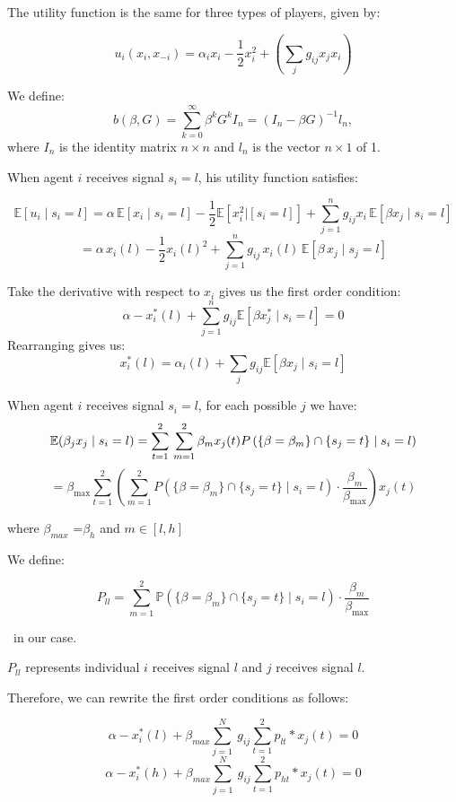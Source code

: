 \documentclass[12pt]{article}
\begin{document}
The utility function is the same for three types of players, given by:

\[
u_i(x_i, x_{-i}) = \alpha_i x_i - \frac{1}{2}x_i^2 + \left( \sum_j g_{ij} x_j x_i \right)
\]

We define:
\[
b(\beta, G) = \sum_{k=0}^{\infty} \beta^k G^k I_n = (I_n - \beta G)^{-1} l_n,
\]
where \( I_n \) is the identity matrix \( n \times n \) and \( l_n \) is the vector \( n \times 1 \) of 1.

When agent $i$ receives signal $s_i = l$, his utility function satisfies:


\[
\mathbb{E}[u_i \mid s_i = l] = \alpha \, \mathbb{E}[x_i \mid s_i = l]
-\frac{1}{2}\mathbb{E}[x_i^2|[s_i=l]]+ \sum_{j = 1}^n g_{ij} x_i\, \mathbb{E}[\beta x_j \mid s_i = l]
\]
\[
= \alpha \, x_i(l) - \frac{1}{2} x_i(l)^2 + \sum_{j=1}^{n} g_{ij} \, x_i(l) \, \mathbb{E}\left[ \beta \, x_j \mid s_j = l \right]
\]


Take the derivative with respect to $x_i$ gives us the first order condition:
\[
\alpha -x_i^*(l) +\sum_{j=1}^{n} g_{ij} \mathbb{E}[\beta x_j^* \mid s_i = l]=0
\]
Rearranging gives us:
\[
x^*_i(l) = \alpha_i(l) + \sum_j g_{ij} \mathbb{E}[\beta x_j \mid s_i = l]
\]



When agent $i$ receives signal $s_i =l$, for each possible $j$ we have:
\[
\mathbb{E}(\beta_j x_j \mid s_i = l) = \sum_{t=1}^{2} \\
\sum_{m=1}^{2} \beta_m x_j(t) P\left( \{\beta = \beta_m\} \cap \{s_j = t\} \mid s_i = l \right)
\]
\[
= \beta_{\max} \sum_{t=1}^{2} \left(\sum_{m=1}^2 P\left( \{\beta = \beta_m\} \cap \{s_j = t\} \mid s_i = l \right) \cdot \frac{\beta_m}{\beta_{\max}} \right)x_j(t)
\]

where $\beta_{max}$ =$\beta_h$ and $m\in[l,h]$

We define:

\[
P_{ll} = \sum_{m=1}^2 \mathbb{P}(\{\beta = \beta_m \}\cap \{s_j = t\} \mid s_i = l) \cdot \frac{\beta_m}{\beta_{\max}}
\]

 \  in our case.

$P_{ll}$ represents individual $i$ receives signal $l$ and $j$ receives signal $l$.

Therefore, we can rewrite the first order conditions as follows:

\[
\alpha - x_i ^*(l)+ \beta_{max}  \sum_{j=1}^{N}\ g_{ij} \sum_{t=1}^{2}p_{lt}*x_j(t)=0
\]
\[
\alpha - x_i ^*(h)+ \beta_{max}  \sum_{j=1}^{N}\ g_{ij} \sum_{t=1}^{2}p_{ht}*x_j(t)=0
\]
\end{document}
